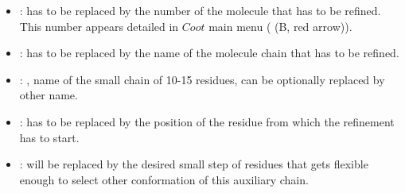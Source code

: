 \begin{itemize}
\begin{itemize}
\begin{itemize}
\begin{itemize}
      \item {}:  has to be replaced by the number of the molecule that has to be refined. This number appears detailed in $Coot$ main menu  ( (B, red arrow)).\\
      \item {}:  has to be replaced by the name of the molecule chain that has to be refined.\\
      \item {}: , name of the small chain of 10-15 residues, can be optionally replaced by other name.\\
      \item {}:  has to be replaced by the position of the residue from which the refinement has to start.\\
      \item {}:  will be replaced by the desired small step of residues that gets flexible enough to select other conformation of this auxiliary chain.\\


\end{itemize}
\end{itemize}
\end{itemize}
\end{itemize}
